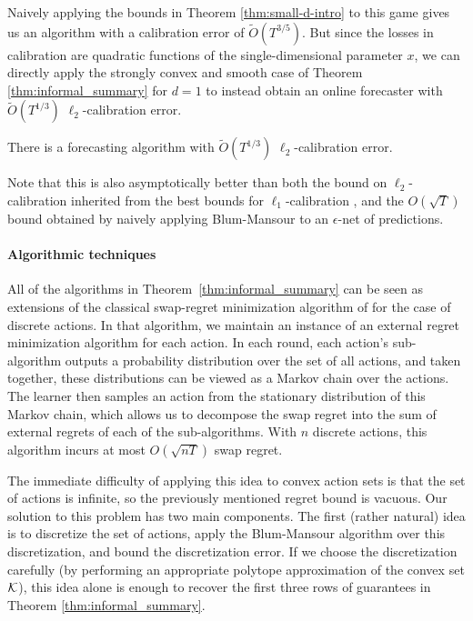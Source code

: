 \documentclass[final,12pt]{alt2025}
\begin{document}
Naively applying the bounds in Theorem \ref{thm:small-d-intro} to this game gives us an algorithm with a calibration error of $\tilde{O}(T^{3/5})$. But since the losses in calibration are quadratic functions of the single-dimensional parameter $x$, we can directly apply the strongly convex and smooth case of Theorem \ref{thm:informal_summary} for $d=1$ to instead obtain an online forecaster with $\tilde{O}(T^{1/3})$ $\ell_2$-calibration error.

\begin{theorem}\label{thm:calib_bound} There is a forecasting algorithm with $\tilde{O}(T^{1/3})$ $\ell_2$-calibration error.
\end{theorem}

Note that this is also asymptotically better than both the bound on $\ell_2$-calibration inherited from the best bounds for $\ell_1$-calibration \citep{dagan2024breakingt23barriersequential}, and the $O(\sqrt{T})$ bound obtained by naively applying Blum-Mansour to an $\epsilon$-net of predictions. 

\paragraph{Algorithmic techniques} All of the algorithms in Theorem~\ref{thm:informal_summary} can be seen as extensions of the classical swap-regret minimization algorithm of \cite{blum2007external} for the case of discrete actions. In that algorithm, we maintain an instance of an external regret minimization algorithm for each action. In each round, each action's sub-algorithm outputs a probability distribution over the set of all actions, and taken together, these distributions can be viewed as a Markov chain over the actions. The learner then samples an action from the stationary distribution of this Markov chain, which allows us to decompose the swap regret into the sum of external regrets of each of the sub-algorithms. With $n$ discrete actions, this algorithm incurs at most $O(\sqrt{nT})$ swap regret.

The immediate difficulty of applying this idea to convex action sets is that the set of actions is infinite, so the previously mentioned regret bound is vacuous. Our solution to this problem has two main components. The first (rather natural) idea is to discretize the set of actions, apply the Blum-Mansour algorithm over this discretization, and bound the discretization error. If we choose the discretization carefully (by performing an appropriate polytope approximation of the convex set $\mathcal{K}$), this idea alone is enough to recover the first three rows of guarantees in Theorem \ref{thm:informal_summary}. 
\end{document}
